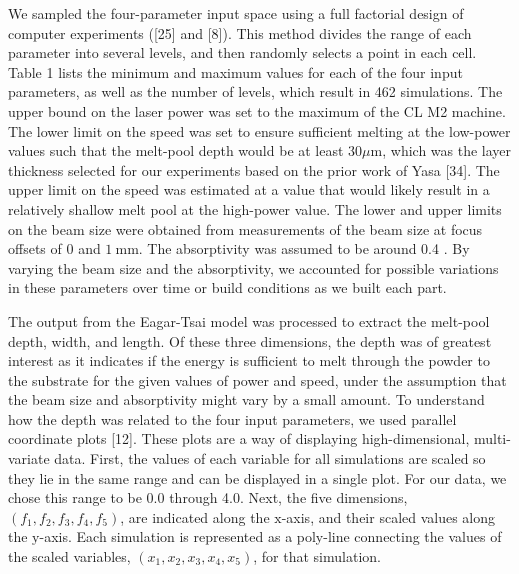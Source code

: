 \documentclass[10pt]{article}
\begin{document}
We sampled the four-parameter input space using a full factorial design of computer experiments ([25] and [8]). This method divides the range of each parameter into several levels, and then randomly selects a point in each cell. Table 1 lists the minimum and maximum values for each of the four input parameters, as well as the number of levels, which result in 462 simulations. The upper bound on the laser power was set to the maximum of the CL M2 machine. The lower limit on the speed was set to ensure sufficient melting at the low-power values such that the melt-pool depth would be at least $30 \mu \mathrm{m}$, which was the layer thickness selected for our experiments based on the prior work of Yasa [34]. The upper limit on the speed was estimated at a value that would likely result in a relatively shallow melt pool at the high-power value. The lower and upper limits on the beam size were obtained from measurements of the beam size at focus offsets of 0 and $1 \mathrm{~mm}$. The absorptivity was assumed to be around 0.4 . By varying the beam size and the absorptivity, we accounted for possible variations in these parameters over time or build conditions as we built each part.

The output from the Eagar-Tsai model was processed to extract the melt-pool depth, width, and length. Of these three dimensions, the depth was of greatest interest as it indicates if the energy is sufficient to melt through the powder to the substrate for the given values of power and speed, under the assumption that the beam size and absorptivity might vary by a small amount. To understand how the depth was related to the four input parameters, we used parallel coordinate plots [12]. These plots are a way of displaying high-dimensional, multi-variate data. First, the values of each variable for all simulations are scaled so they lie in the same range and can be displayed in a single plot. For our data, we chose this range to be 0.0 through 4.0. Next, the five dimensions, $\left(f_{1}, f_{2}, f_{3}, f_{4}, f_{5}\right)$, are indicated along the $\mathrm{x}$-axis, and their scaled values along the $\mathrm{y}$-axis. Each simulation is represented as a poly-line connecting the values of the scaled variables, $\left(x_{1}, x_{2}, x_{3}, x_{4}, x_{5}\right)$, for that simulation.
\end{document}
